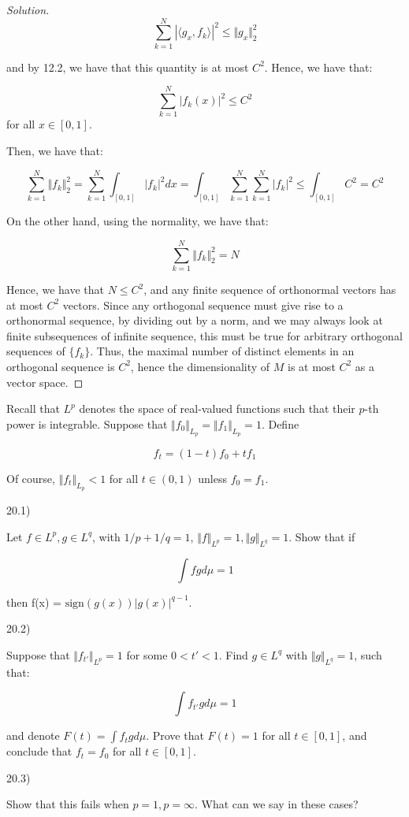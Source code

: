 \documentclass[10pt]{article}
\newenvironment{problem}[2][]{\begin{trivlist}
\item[\hskip \labelsep {\bfseries #1}\hskip \labelsep {\bfseries #2.}]}{\end{trivlist}}
\begin{document}
\begin{proof}[Solution]
$$ \sum_{k=1}^N | \langle g_x, f_k \rangle |^2 \leq \Vert g_x \Vert_2^2$$

and by 12.2, we have that this quantity is at most $ C^2$. Hence, we have that:

$$ \sum_{k=1}^N | f_k(x) |^2 \leq C^2$$ for all $x \in [0,1]$.

Then, we have that:

$$\sum_{k=1}^N \Vert f_k \Vert_2^2 = \sum_{k=1}^N\int_{[0,1]} | f_k |^2 dx = \int_{[0,1]} \sum_{k=1}^N \sum_{k=1}^N |f_k|^2 \leq \int_{[0,1]} C^2 = C^2$$

On the other hand, using the normality, we have that:

$$ \sum_{k=1}^N \Vert f_k \Vert_2^2 = N$$

Hence, we have that $N \leq C^2$, and any finite sequence of orthonormal vectors has at most $C^2$ vectors. Since any orthogonal sequence must give rise to a orthonormal sequence, by dividing out by a norm, and we may always look at finite subsequences of infinite sequence, this must be true for arbitrary orthogonal sequences of $\{ f_k \}$. Thus, the maximal number of distinct elements in an orthogonal sequence is $C^2$, hence the dimensionality of $M$ is at most $C^2$ as a vector space.

\end{proof}


\begin{problem}{Question 20}

Recall that $L^p$ denotes the space of real-valued functions such that their $p$-th power is integrable. Suppose that $\Vert f_0 \Vert_{L_p} = \Vert f_1 \Vert_{L_p} = 1$. Define

$$ f_t = (1- t)f_0 + tf_1 $$

Of course, $\Vert f_t \Vert_{L_p} < 1$ for all $t \in (0,1)$ unless $f_0 = f_1$.

20.1)

Let $f \in L^p, g \in L^q$, with $1/p + 1/q = 1$, $\Vert f \Vert_{L^p} = 1, \Vert g \Vert_{L^q} = 1$. Show that if 

$$ \int fg d\mu = 1$$ 

then f(x) = $\text{sign}(g(x)) | g(x)|^{q-1}$.

20.2)

Suppose that $\Vert f_{t'} \Vert_{L^p} = 1$ for some $0 < t' < 1$. Find $g \in L^q$ with $\Vert g \Vert_{L^q} = 1$, such that:

$$ \int f_{t'}g d\mu = 1$$

and denote $F(t) = \int f_t g d\mu$. Prove that $F(t) = 1$ for all $t \in [0,1]$, and conclude that $f_t = f_0$ for all $t \in [0,1]$.

20.3)

Show that this fails when $p = 1, p = \infty$. What can we say in these cases?

\end{problem}
\end{document}
